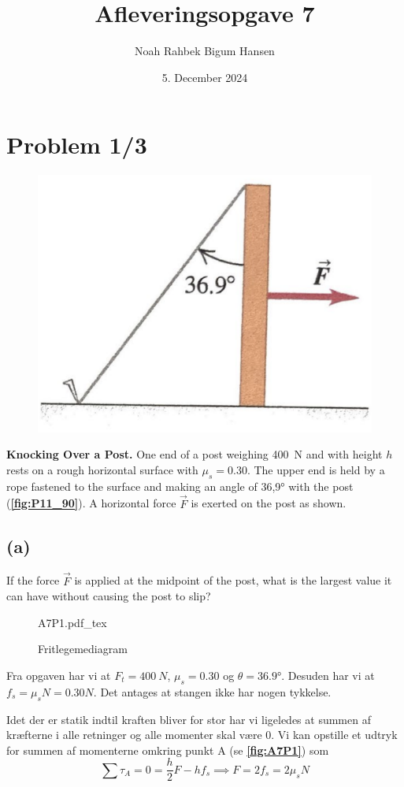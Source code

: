 \documentclass[12pt]{article}
\title{Afleveringsopgave 7}
\author{Noah Rahbek Bigum Hansen}
\date{5. December 2024}
\newcommand{\incfig}[2][1]{%
  \def\svgwidth{#1\columnwidth}
  {#2.pdf_tex}
}
\theoremstyle{definition}
\begin{document}
\maketitle

\section*{Problem 1/3}
\begin{figure} [ht]
  \centering
  \caption{}
  \includegraphics[width=0.5\linewidth]{../figures/P11_90.png}
  \label{fig:P11_90}
\end{figure}
\textbf{Knocking Over a Post.} One end of a post weighing \qty{400}{N} and with height $h$ rests on a rough horizontal surface with $\mu_s = \num{0,30}$. The upper end is held by a rope fastened to the surface and making an angle of \ang{36,9} with the post (\textbf{\autoref{fig:P11_90}}). A horizontal force $\Vec{F}$ is exerted on the post as shown.

\subsection*{(a)}
If the force $\Vec{F}$ is applied at the midpoint of the post, what is the largest value it can have without causing the post to slip?
\begin{figure}[ht]
  \centering
  \incfig[0.8]{A7P1}
  \caption{Fritlegemediagram}
  \label{fig:A7P1}
\end{figure}
\bigbreak
Fra opgaven har vi at $F_t = \qty{400}{N}$, $\mu_s = \num{0,30}$ og $\theta = \ang{36,9}$. Desuden har vi at $f_s = \mu_s N = \num{0,30}N$. Det antages at stangen ikke har nogen tykkelse. 

Idet der er statik indtil kraften bliver for stor har vi ligeledes at summen af kræfterne i alle retninger og alle momenter skal være 0. Vi kan opstille et udtryk for summen af momenterne omkring punkt A (se \textbf{\autoref{fig:A7P1}}) som
\begin{equation} \label{eq:kraft}
  \sum \tau_A = 0 = \frac{h}{2}F - hf_s \implies F = 2f_s = 2 \mu_s N
\end{equation}
\end{document}
